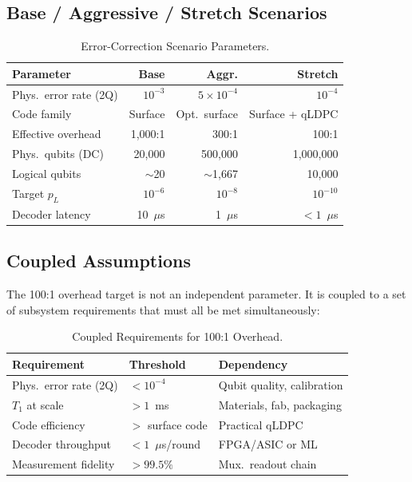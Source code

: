 \documentclass[conference]{IEEEtran}
\begin{document}
\subsection{Base / Aggressive / Stretch Scenarios}

\begin{table}[htbp]
\centering
\caption{Error-Correction Scenario Parameters.}
\label{tab:qec_scenarios}
\begin{tabular}{lrrr}
\toprule
\textbf{Parameter} & \textbf{Base} & \textbf{Aggr.} & \textbf{Stretch} \\
\midrule
Phys.\ error rate (2Q) & $10^{-3}$ & $5 \times 10^{-4}$ & $10^{-4}$ \\
Code family & Surface & Opt.\ surface & Surface + qLDPC \\
Effective overhead & 1,000:1 & 300:1 & 100:1 \\
Phys.\ qubits (DC) & 20,000 & 500,000 & 1,000,000 \\
Logical qubits & ${\sim}$20 & ${\sim}$1,667 & 10,000 \\
Target $p_L$ & $10^{-6}$ & $10^{-8}$ & $10^{-10}$ \\
Decoder latency & 10~$\mu$s & 1~$\mu$s & $< 1$~$\mu$s \\
\bottomrule
\end{tabular}
\end{table}

\subsection{Coupled Assumptions}

The 100:1 overhead target is not an independent parameter. It is coupled to a set of subsystem requirements that must all be met simultaneously:

\begin{table}[htbp]
\centering
\caption{Coupled Requirements for 100:1 Overhead.}
\label{tab:coupled}
\begin{tabular}{llp{2.5cm}}
\toprule
\textbf{Requirement} & \textbf{Threshold} & \textbf{Dependency} \\
\midrule
Phys.\ error rate (2Q) & $< 10^{-4}$ & Qubit quality, calibration \\
$T_1$ at scale & $> 1$~ms & Materials, fab, packaging \\
Code efficiency & $>$ surface code & Practical qLDPC \\
Decoder throughput & $< 1$~$\mu$s/round & FPGA/ASIC or ML \\
Measurement fidelity & $> 99.5\%$ & Mux.\ readout chain \\
\bottomrule
\end{tabular}
\end{table}
\end{document}
